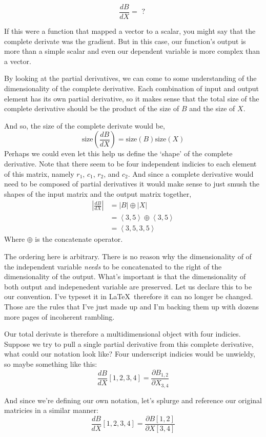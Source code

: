 \documentclass[12pt]{book}
\theoremstyle{plain}
\theoremstyle{definition}
\theoremstyle{ppart}
\theoremstyle{case}
\theoremstyle{solution}
\begin{document}
\[\frac{dB}{dX} = \mbox{ ? }\]

If this were a function that mapped a vector to a scalar, you might say that the
complete derivate was the gradient. But in this case, our function's output is more
than a simple scalar and even our dependent variable is more complex than a vector.

By looking at the partial derivatives, we can come to some understanding of the
dimensionality of the complete derivative. Each combination of input and output
element has its own partial derivative, so it makes sense that the total size
of the complete derivative should be the product of the size of $B$ and the size
of $X$.

And so, the size of the complete derivate would be,
\[
\mbox{size}\left(\frac{dB}{dX}\right) = \mbox{size}(B) \mbox{size}(X)
\]
Perhaps we could even let this help us define the `shape' of the complete
derivative. Note that there seem to be four independent indicies to each element
of this matrix, namely $r_1$, $c_1$, $r_2$, and $c_2$.
And since a complete derivative would need to be composed of partial derivatives
it would make sense to just smush the shapes of the input matrix and the output
matrix together,
\begin{align*}
\left|\frac{dB}{dX}\right| &= |B| \oplus |X| \\
 &= \left< 3, 5 \right> \oplus \left< 3, 5 \right> \\
 &= \left< 3, 5, 3, 5 \right>
\end{align*}
Where $\oplus$ is the concatenate operator.

The ordering here is arbitrary. There is no reason why the dimensionality of
of the independent variable \textit{needs} to be concatenated to the right of the
dimensionality of the output. What's important is that the dimensionality of
both output and indepenedent variable are preserved. Let us declare this to
be our convention. I've typeset it in \LaTeX ~therefore it can no longer be
changed. Those are the rules that I've just made up and I'm backing them up with
dozens more pages of incoherent rambling.

Our total derivate is therefore a multidimensional object with four indicies.
Suppose we try to pull a single partial derivative from this complete derivative,
what could our notation look like? Four underscript indicies would be unwieldy,
so maybe something like this:
\[
\frac{dB}{dX}[1,2,3,4] = \frac{\partial B_{1,2}}{\partial X_{3,4}}
\]

And since we're defining our own notation, let's splurge and reference our original
matricies in a similar manner:
\[
\frac{dB}{dX}[1,2,3,4] = \frac{\partial B[1,2]}{\partial X[3,4]}
\]
\end{document}
